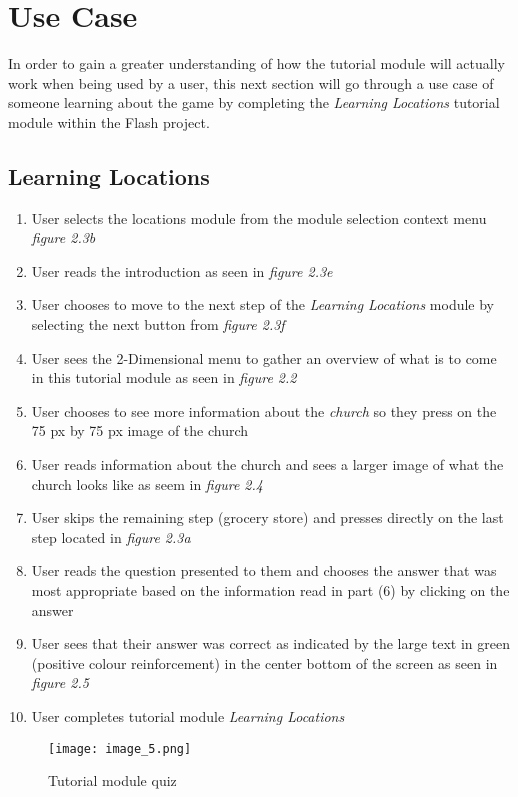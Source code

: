 \documentclass[12pt]{report}
\begin{document}
\section{Use Case}
In order to gain a greater understanding of how the tutorial module will actually work when being used by a user, this next section will go through a use case of someone learning about the game by completing the \textit{Learning Locations} tutorial module within the Flash project.
\subsection{Learning Locations}
\begin{enumerate}
\item User selects the locations module from the module selection context menu \textit{figure 2.3b}
\item User reads the introduction as seen in \textit{figure 2.3e}
\item User chooses to move to the next step of the \textit{Learning Locations} module by selecting the next button from \textit{figure 2.3f}
\item User sees the 2-Dimensional menu to gather an overview of what is to come in this tutorial module as seen in \textit{figure 2.2}
\item User chooses to see more information about the \textit{church} so they press on the 75 px by 75 px image of the church
\item User reads information about the church and sees a larger image of what the church looks like as seem in \textit{figure 2.4}
\item User skips the remaining step (grocery store) and presses directly on the last step located in \textit{figure 2.3a}
\item User reads the question presented to them and chooses the answer that was most appropriate based on the information read in part (6) by clicking on the answer
\item User sees that their answer was correct as indicated by the large text in green (positive colour reinforcement) in the center bottom of the screen as seen in \textit{figure 2.5}
\item User completes tutorial module \textit{Learning Locations}
\end{enumerate}

\begin{figure}
\begin{center}
\leavevmode
\texttt{[image: image\_5.png]}
\end{center}
\caption{Tutorial module quiz}
\label{fig:warztutQuiz}
\end{figure}
\end{document}

